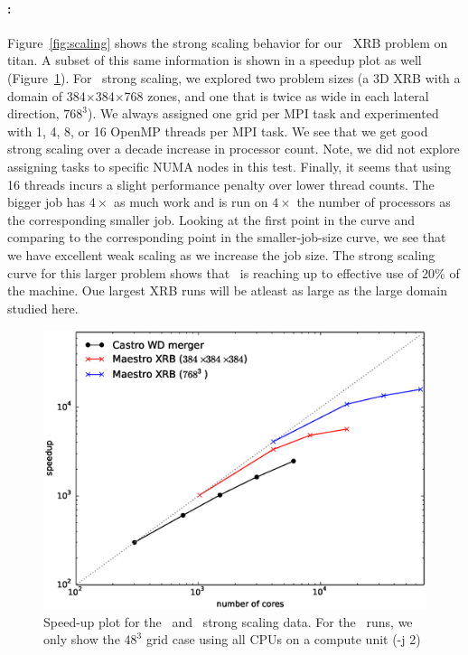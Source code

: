 \paragraph{\maestro: }
%
Figure~\ref{fig:scaling} shows the strong scaling behavior for our
\maestro\ XRB problem on titan.  A subset of this same information is
shown in a speedup plot as well (Figure~\ref{fig:speedup}).
For  \maestro\ strong scaling, we
explored two problem sizes (a 3D XRB with a domain of
384$\times$384$\times$768 zones, and one that is twice as wide in each
lateral direction, $768^3$).  We always assigned one grid per MPI task
and experimented with 1, 4, 8, or 16 OpenMP threads per MPI task.  We
see that we get good strong scaling over a decade increase in
processor count.  Note, we did not explore assigning tasks to specific
NUMA nodes in this test.  Finally, it seems that using 16 threads
incurs a slight performance penalty over lower thread counts.  The
bigger job has $4\times$ as much work and is run on $4\times$ the
number of processors as the corresponding smaller job.  Looking at the
first point in the curve and comparing to the corresponding point in
the smaller-job-size curve, we see that we have excellent weak scaling
as we increase the job size.  The strong scaling curve for this larger
problem shows that \maestro\ is reaching up to effective use of 20\%
of the machine.  Oue largest XRB runs will be atleast as large as the
large domain studied here.

\begin{figure}[t]
\centering
\includegraphics[width=0.48\linewidth]{speedup}
\begin{minipage}[b]{0.5\linewidth}
\caption{\label{fig:speedup} Speed-up plot for the \maestro\
and \castro\ strong scaling data.  For the \maestro\ runs,
we only show the $48^3$ grid case using all CPUs on a compute
unit (-j 2)}
\end{minipage}
\end{figure}

